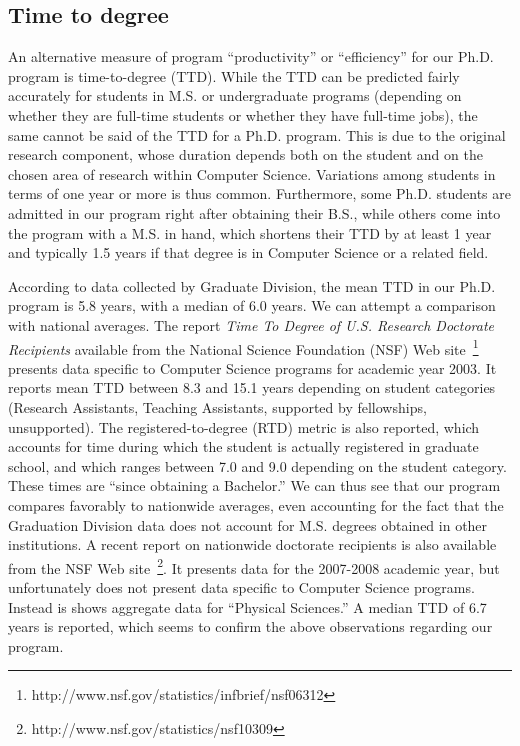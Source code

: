 \documentclass[12pt]{article}
\begin{document}
\subsection{Time to degree}

An alternative measure of program ``productivity'' or ``efficiency'' for
our Ph.D. program is time-to-degree (TTD).  While the TTD can be predicted
fairly accurately for students in M.S. or undergraduate programs (depending
on whether they are full-time students or whether they have full-time
jobs), the same cannot be said of the TTD for a Ph.D. program. This is due
to the original research component, whose duration depends both on the
student and on the chosen area of research within Computer
Science. Variations among students in terms of one year or more is thus
common. Furthermore, some Ph.D.  students are admitted in our program right
after obtaining their B.S., while others come into the program with a
M.S. in hand, which shortens their TTD by at least 1 year and typically 1.5
years if that degree is in Computer Science or a related field.

According to data collected by Graduate Division, the mean TTD in our
Ph.D. program is 5.8 years, with a median of 6.0 years. We can attempt
a comparison with national averages. The report \emph{Time
To Degree of U.S. Research Doctorate Recipients} available from the
National Science Foundation (NSF) Web
site~\footnote{http://www.nsf.gov/statistics/infbrief/nsf06312}
presents data specific to Computer Science programs for academic year
2003. It reports mean TTD between 8.3 and 15.1 years depending on
student categories (Research Assistants, Teaching Assistants,
supported by fellowships, unsupported). The registered-to-degree (RTD)
metric is also reported, which accounts for time during which the
student is actually registered in graduate school, and which ranges
between 7.0 and 9.0 depending on the student category. These times are
``since obtaining a Bachelor.'' We can thus see that our program
compares favorably to nationwide averages, even accounting for the
fact that the Graduation Division data does not account for M.S.
degrees obtained in other institutions.  A recent report on nationwide
doctorate recipients is also available from the NSF Web
site~\footnote{http://www.nsf.gov/statistics/nsf10309}. It presents
data for the 2007-2008 academic year, but unfortunately does not
present data specific to Computer Science programs. Instead is shows
aggregate data for ``Physical Sciences.'' A median TTD of 6.7 years is
reported, which seems to confirm the above observations regarding our program.
\end{document}
